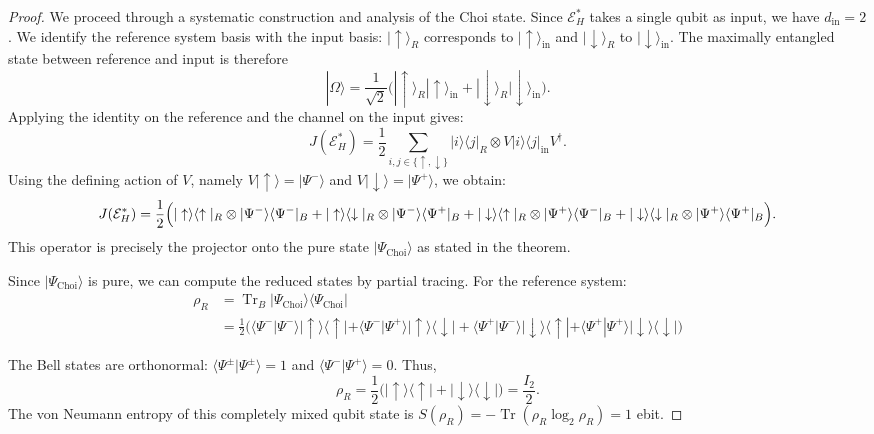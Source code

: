 \documentclass[12pt,a4paper]{article}
\begin{document}
\begin{proof}
We proceed through a systematic construction and analysis of the Choi state.
Since $\mathcal{E}_H^*$ takes a single qubit as input, we have $d_{\text{in}}=2$. We identify the reference system basis with the input basis: $|\uparrow\rangle_R$ corresponds to $|\uparrow\rangle_{\text{in}}$ and $|\downarrow\rangle_R$ to $|\downarrow\rangle_{\text{in}}$. The maximally entangled state between reference and input is therefore
\[
|\Omega\rangle = \frac{1}{\sqrt{2}}\bigl(|\uparrow\rangle_R|\uparrow\rangle_{\text{in}} + |\downarrow\rangle_R|\downarrow\rangle_{\text{in}}\bigr).
\]
Applying the identity on the reference and the channel on the input gives:
\[
J(\mathcal{E}_H^*) = \frac{1}{2}\sum_{i,j \in \{\uparrow,\downarrow\}} |i\rangle\langle j|_R \otimes V|i\rangle\langle j|_{\text{in}} V^\dagger.
\]
Using the defining action of $V$, namely $V|\uparrow\rangle = |\Psi^-\rangle$ and $V|\downarrow\rangle = |\Psi^+\rangle$, we obtain:
\[
J(\mathcal{E}_H^*) = \frac{1}{2}\Bigl( |\uparrow\rangle\langle\uparrow|_R \otimes |\Psi^-\rangle\langle\Psi^-|_B + |\uparrow\rangle\langle\downarrow|_R \otimes |\Psi^-\rangle\langle\Psi^+|_B + |\downarrow\rangle\langle\uparrow|_R \otimes |\Psi^+\rangle\langle\Psi^-|_B + |\downarrow\rangle\langle\downarrow|_R \otimes |\Psi^+\rangle\langle\Psi^+|_B \Bigr).
\]
This operator is precisely the projector onto the pure state $|\Psi_{\mathrm{Choi}}\rangle$ as stated in the theorem.

\vspace{0.5em}

Since $|\Psi_{\mathrm{Choi}}\rangle$ is pure, we can compute the reduced states by partial tracing. For the reference system:
\begin{align*}
\rho_R &= \operatorname{Tr}_B |\Psi_{\mathrm{Choi}}\rangle\langle\Psi_{\mathrm{Choi}}|\\
&= \frac{1}{2}\bigl(\langle\Psi^-|\Psi^-\rangle |\uparrow\rangle\langle\uparrow| + \langle\Psi^-|\Psi^+\rangle|\uparrow\rangle\langle\downarrow| + \langle\Psi^+|\Psi^-\rangle|\downarrow\rangle\langle\uparrow| + \langle\Psi^+|\Psi^+\rangle|\downarrow\rangle\langle\downarrow| \bigr)
\end{align*}


The Bell states are orthonormal: $\langle\Psi^\pm|\Psi^\pm\rangle=1$ and $\langle\Psi^-|\Psi^+\rangle=0$. Thus,
\[
\rho_R = \frac{1}{2}\bigl(|\uparrow\rangle\langle\uparrow| + |\downarrow\rangle\langle\downarrow|\bigr) = \frac{I_2}{2}.
\]
The von Neumann entropy of this completely mixed qubit state is $S(\rho_R) = -\operatorname{Tr}(\rho_R \log_2 \rho_R) = 1$ ebit.


\end{proof}
\end{document}
